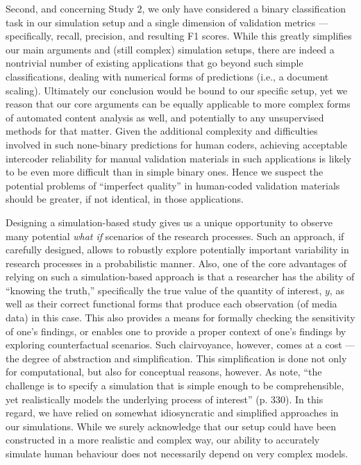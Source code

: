 \documentclass[man, floatsintext, 12pt, a4paper, noextraspace]{apa6}
\begin{document}
    Second, and concerning Study 2, we only have considered a binary classification task in our simulation setup and a single dimension of validation metrics --- specifically, recall, precision, and resulting F1 scores. While this greatly simplifies our main arguments and (still complex) simulation setups, there are indeed a nontrivial number of existing applications that go beyond such simple classifications, dealing with numerical forms of predictions (i.e., a document scaling). Ultimately our conclusion would be bound to our specific setup, yet we reason that our core arguments can be equally applicable to more complex forms of automated content analysis as well, and potentially to any unsupervised methods for that matter. Given the additional complexity and difficulties involved in such none-binary predictions for human coders, achieving acceptable intercoder reliability for manual validation materials in such applications is likely to be even more difficult than in simple binary ones. Hence we suspect the potential problems of \enquote{imperfect quality} in human-coded validation materials should be greater, if not identical, in those applications. 

    Designing a simulation-based study gives us a unique opportunity to observe many potential \textit{what if} scenarios of the research processes. Such an approach, if carefully designed, allows to robustly explore potentially important variability in research processes in a probabilistic manner. Also, one of the core advantages of relying on such a simulation-based approach is that a researcher has the ability of \enquote{knowing the truth,} specifically the true value of the quantity of interest, $y$, as well as their correct functional forms that produce each observation (of media data) in this case. This also provides a means for formally checking the sensitivity of one’s findings, or enables one to provide a proper context of one's findings by exploring counterfactual scenarios. Such clairvoyance, however, comes at a cost --- the degree of abstraction and simplification. This simplification is done not only for computational, but also for conceptual reasons, however. As \textcite{scharkow2017measurement} note, \enquote{the challenge is to specify a simulation that is simple enough to be comprehensible, yet realistically models the underlying process of interest} (p. 330). In this regard, we have relied on somewhat idiosyncratic and simplified approaches in our simulations. While we surely acknowledge that our setup could have been constructed in a more realistic and complex way, our ability to accurately simulate human behaviour does not necessarily depend on very complex models. 
\end{document}
